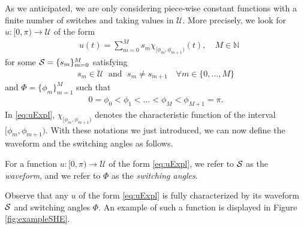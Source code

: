 \documentclass[twocolumn]{autart}    %
\begin{document}
As we anticipated,  we are only considering piece-wise constant functions with a finite number of switches and taking values in $\mathcal{U}$.
More precisely, we look for $u: [0,\pi)\to \mathcal{U}$ of the form
\begin{align}\label{eq:uExpl}
	&u (t)= \sum_{m=0}^M s_m\chi_{[\phi_m,\phi_{m+1})} (t), \quad M\in\mathbb{N} 
\end{align}
for some $\mathcal{S} = \{ s_m\}_{m=0}^M$ satisfying
\begin{align*}
	s_m\in \mathcal{U} \; \text{ and } \; s_m\neq s_{m+1} \quad \forall m\in \{0,\ldots, M\}
\end{align*}
and $\Phi = \{ \phi_m\}_{m=1}^{M}$ such that
\begin{align*}
	0= \phi_0 < \phi_1 <\ldots < \phi_M < \phi_{M+1} = \pi .
\end{align*}
In \eqref{eq:uExpl}, $\chi_{[\phi_m,\phi_{m+1})}$ denotes the characteristic function of the interval $[\phi_m,\phi_{m+1})$. With these notations we just introduced, we can now define the waveform and the switching angles as follows.

\bigskip

\begin{definition}\label{def: waveform and switching angles}
For a function $u: [0,\pi) \to \mathcal{U}$ of the form \eqref{eq:uExpl}, we refer to $\mathcal{S}$ as the \emph{waveform}, and we refer to $\Phi$ as the \emph{switching angles}.
\end{definition}

Observe that any $u$ of the form \eqref{eq:uExpl} is fully characterized by its waveform $\mathcal{S}$ and switching angles $\Phi$. An example of such a function is displayed in Figure \ref{fig:exampleSHE}. 
\end{document}
